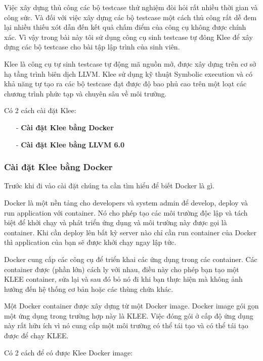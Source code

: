 \documentclass[12pt,a4paper]{article}
\begin{document}
Việc xây dựng thủ công các bộ testcase thử nghiệm đòi hỏi rất nhiều thời gian và công sức. Và đối với việc xây dựng các bộ testcase một cách thủ công rất dễ đem lại nhiều thiếu xót dẫn đến kết quả chấm điểm của công cụ không được chính xác. Vì vậy trong bài này tôi sử dụng công cụ sinh testcase tự đông Klee để xây dựng các bộ testcase cho bài tập lập trình của sinh viên.

Klee là công cụ tự sinh testcase tự động mã nguồn mở, được xây dựng trên cơ sở hạ tầng trình biên dịch LLVM. Klee sử dụng kỹ thuật Symbolic execution và có khả năng tự tạo ra các bộ testcase đạt được độ bao phủ cao trên một loạt các chương trình phức tạp và chuyên sâu về môi trường.

Có 2 cách cài đặt Klee:
\begin{itemize}
\item[-] \textbf{Cài đặt Klee bằng Docker}
\item[-] \textbf{Cài đặt Klee bằng LLVM 6.0}
\end{itemize}

\subsubsection{Cài đặt Klee bằng Docker}
Trước khi đi vào cài đặt chúng ta cần tìm hiểu để biết Docker là gì.

Docker là một nền tảng cho developers và system admin để develop, deploy và run application với container. Nó cho phép tạo các môi trường độc lập và tách biệt để khởi chạy và phát triển ứng dụng và môi trường này được gọi là container. Khi cần deploy lên bất kỳ server nào chỉ cần run container của Docker thì application của bạn sẽ được khởi chạy ngay lập tức.

Docker cung cấp các công cụ để triển khai các ứng dụng trong các container. Các container được (phần lớn) cách ly với nhau, điều này cho phép bạn tạo một KLEE container, sửa lại và sau đó bỏ nó đi khi bạn thực hiện mà không ảnh hưởng đến hệ thống cơ bản hoặc các thùng chứa khác.

Một Docker container được xây dựng từ một Docker image. Docker image gói gọn một ứng dụng trong trường hợp này là KLEE. Việc đóng gói ở cấp độ ứng dụng này rất hữu ích vì nó cung cấp một môi trường có thể tái tạo và có thể tái tạo được để chạy KLEE.

Có 2 cách để có được Klee Docker image:
\end{document}
